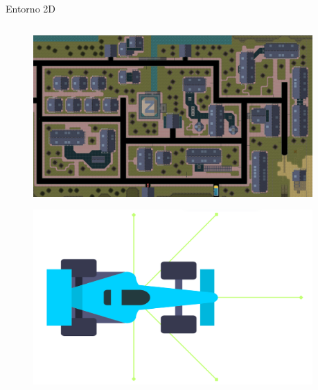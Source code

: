 \documentclass{beamer}
\begin{document}
\begin{frame}{Entorno 2D}
    \begin{columns}
        \begin{column}{0.5\textwidth}
            \begin{figure}
                \centering
                \includegraphics[width=\linewidth]{images/gta2.png}
            \end{figure}
            \vspace{0.5cm} %
            \begin{figure}
                \centering
                \includegraphics[width=\linewidth]{images/sensores.png}
            \end{figure}
        \end{column}
        \begin{column}{0.5\textwidth}
            \begin{itemize}

\end{itemize}
\end{column}
\end{columns}
\end{frame}
\end{document}
